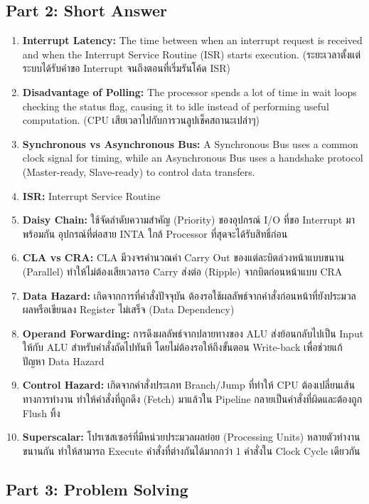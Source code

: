 \documentclass[12pt]{article}
\begin{document}
\subsection*{Part 2: Short Answer}
\begin{enumerate}
    \item \textbf{Interrupt Latency:} The time between when an interrupt request is received and when the Interrupt Service Routine (ISR) starts execution. (ระยะเวลาตั้งแต่ระบบได้รับคำขอ Interrupt จนถึงตอนที่เริ่มรันโค้ด ISR)
    \item \textbf{Disadvantage of Polling:} The processor spends a lot of time in wait loops checking the status flag, causing it to idle instead of performing useful computation. (CPU เสียเวลาไปกับการวนลูปเช็คสถานะเปล่าๆ)
    \item \textbf{Synchronous vs Asynchronous Bus:} A Synchronous Bus uses a common clock signal for timing, while an Asynchronous Bus uses a handshake protocol (Master-ready, Slave-ready) to control data transfers.
    \item \textbf{ISR:} Interrupt Service Routine
    \item \textbf{Daisy Chain:} ใช้จัดลำดับความสำคัญ (Priority) ของอุปกรณ์ I/O ที่ขอ Interrupt มาพร้อมกัน อุปกรณ์ที่ต่อสาย INTA ใกล้ Processor ที่สุดจะได้รับสิทธิ์ก่อน
    \item \textbf{CLA vs CRA:} CLA มีวงจรคำนวณค่า Carry Out ของแต่ละบิตล่วงหน้าแบบขนาน (Parallel) ทำให้ไม่ต้องเสียเวลารอ Carry ส่งต่อ (Ripple) จากบิตก่อนหน้าแบบ CRA
    \item \textbf{Data Hazard:} เกิดจากการที่คำสั่งปัจจุบัน ต้องรอใช้ผลลัพธ์จากคำสั่งก่อนหน้าที่ยังประมวลผลหรือเขียนลง Register ไม่เสร็จ (Data Dependency)
    \item \textbf{Operand Forwarding:} การดึงผลลัพธ์จากปลายทางของ ALU ส่งย้อนกลับไปเป็น Input ให้กับ ALU สำหรับคำสั่งถัดไปทันที โดยไม่ต้องรอให้ถึงขั้นตอน Write-back เพื่อช่วยแก้ปัญหา Data Hazard
    \item \textbf{Control Hazard:} เกิดจากคำสั่งประเภท Branch/Jump ที่ทำให้ CPU ต้องเปลี่ยนเส้นทางการทำงาน ทำให้คำสั่งที่ถูกดึง (Fetch) มาแล้วใน Pipeline กลายเป็นคำสั่งที่ผิดและต้องถูก Flush ทิ้ง
    \item \textbf{Superscalar:} โปรเซสเซอร์ที่มีหน่วยประมวลผลย่อย (Processing Units) หลายตัวทำงานขนานกัน ทำให้สามารถ Execute คำสั่งที่ต่างกันได้มากกว่า 1 คำสั่งใน Clock Cycle เดียวกัน
\end{enumerate}

\subsection*{Part 3: Problem Solving}
\end{document}

